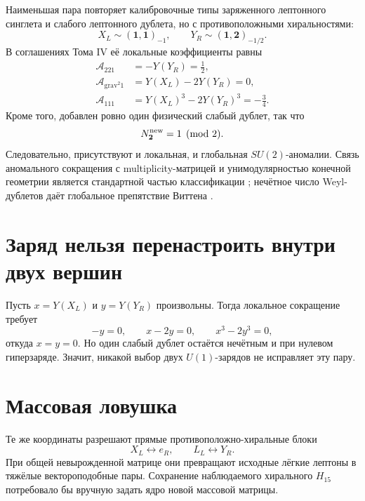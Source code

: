 Наименьшая пара повторяет калибровочные типы заряженного лептонного
синглета и слабого лептонного дублета, но с противоположными хиральностями:
\begin{equation}
 X_L\sim(\mathbf1,\mathbf1)_{-1},\qquad
 Y_R\sim(\mathbf1,\mathbf2)_{-1/2}.
 \label{eq:v7-mirror-pair-canonical-charges}
\end{equation}
В соглашениях Тома IV её локальные коэффициенты равны
\begin{align}
 \mathcal A_{221}&=-Y(Y_R)=\frac12,\nonumber\\
 \mathcal A_{\mathrm{grav}^2 1}&=Y(X_L)-2Y(Y_R)=0,\nonumber\\
 \mathcal A_{111}&=Y(X_L)^3-2Y(Y_R)^3=-\frac34.
 \label{eq:v7-mirror-pair-canonical-anomalies}
\end{align}
Кроме того, добавлен ровно один физический слабый дублет, так что
\begin{equation}
 N_{\mathbf2}^{\rm new}=1\pmod 2.
 \label{eq:v7-mirror-pair-witten-parity}
\end{equation}
Следовательно, присутствуют и локальная, и глобальная $SU(2)$-аномалии.
Связь аномального сокращения с multiplicity-матрицей и унимодулярностью
конечной геометрии является стандартной частью классификации
\cite{v7mirror-krajewski,v7mirror-alvarez}; нечётное число Weyl-дублетов
даёт глобальное препятствие Виттена \cite{v7mirror-witten}.

\section{Заряд нельзя перенастроить внутри двух вершин}

Пусть $x=Y(X_L)$ и $y=Y(Y_R)$ произвольны. Тогда локальное сокращение требует
\begin{equation}
 -y=0,\qquad x-2y=0,\qquad x^3-2y^3=0,
 \label{eq:v7-mirror-pair-general-anomaly-system}
\end{equation}
откуда $x=y=0$. Но один слабый дублет остаётся нечётным и при нулевом
гиперзаряде. Значит, никакой выбор двух $U(1)$-зарядов не исправляет эту
пару.

\section{Массовая ловушка}

Те же координаты разрешают прямые противоположно-хиральные блоки
\begin{equation}
 X_L\longleftrightarrow e_R,\qquad
 L_L\longleftrightarrow Y_R.
 \label{eq:v7-mirror-pair-direct-masses}
\end{equation}
При общей невырожденной матрице они превращают исходные лёгкие лептоны в
тяжёлые вектороподобные пары. Сохранение наблюдаемого хирального $H_{15}$
потребовало бы вручную задать ядро новой массовой матрицы.

